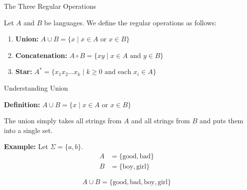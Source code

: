 \documentclass[10pt,aspectratio=169]{beamer}
\begin{document}
\begin{frame}{The Three Regular Operations}

Let $A$ and $B$ be languages. We define the regular operations as follows:

\vspace{1em}

\begin{enumerate}
    \item \textbf{Union:} $A \cup B = \{x \mid x \in A \text{ or } x \in B\}$
    \vspace{0.5em}
    \item \textbf{Concatenation:} $A \circ B = \{xy \mid x \in A \text{ and } y \in B\}$
    \vspace{0.5em}
    \item \textbf{Star:} $A^* = \{x_1x_2\dots x_k \mid k \geq 0 \text{ and each } x_i \in A\}$
\end{enumerate}

\end{frame}

\begin{frame}{Understanding Union}

\textbf{Definition:} $A \cup B = \{x \mid x \in A \text{ or } x \in B\}$

\vspace{1em}

The union simply takes all strings from $A$ and all strings from $B$ and puts them into a single set.

\vspace{1em}

\textbf{Example:}
Let $\Sigma = \{a, b\}$.
\begin{align*}
A &= \{\text{good}, \text{bad}\} \\
B &= \{\text{boy}, \text{girl}\}
\end{align*}

$$A \cup B = \{\text{good}, \text{bad}, \text{boy}, \text{girl}\}$$

\end{frame}
\end{document}
